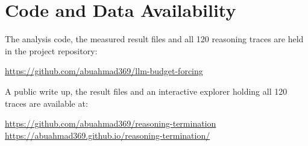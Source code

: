 \documentclass[12pt,a4paper,oneside]{report}
\begin{document}
\chapter*{Code and Data Availability}

The analysis code, the measured result files and all 120 reasoning traces are held
in the project repository:

\begin{center}
\url{https://github.com/abuahmad369/llm-budget-forcing}
\end{center}

A public write up, the result files and an interactive explorer holding all 120
traces are available at:

\begin{center}
\url{https://github.com/abuahmad369/reasoning-termination}\\[4pt]
\url{https://abuahmad369.github.io/reasoning-termination/}
\end{center}
\end{document}
